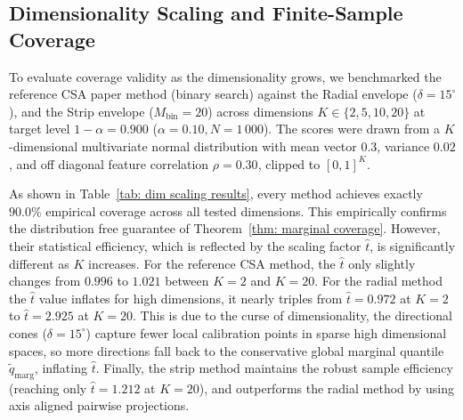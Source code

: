 

\subsection{Dimensionality Scaling and Finite-Sample Coverage}
\label{sec5.1.2: dimensionality scaling}

To evaluate coverage validity as the dimensionality grows, we benchmarked the reference CSA paper method (binary 
search) against the Radial envelope ($\delta = 15^\circ$), and the Strip envelope ($M_{\text{bin}} = 20$) across dimensions 
$K \in \{2, 5, 10, 20\}$ at target level $1-\alpha = 0.900$ ($\alpha = 0.10, N = 1\,000$). The scores were drawn from a 
$K$-dimensional multivariate normal distribution with mean vector $\mathbf{0.3}$, variance $0.02$, and off diagonal feature 
correlation $\rho = 0.30$, clipped to $[0,1]^K$.


As shown in Table~\ref{tab: dim scaling results}, every method achieves exactly $90.0\%$ empirical coverage across 
all tested dimensions. This empirically confirms the distribution free guarantee of Theorem~\ref{thm: marginal coverage}. 
However, their statistical efficiency, which is reflected by the scaling factor $\hat{t}$, is significantly different as $K$ 
increases. For the reference CSA method, the $\hat{t}$ only slightly changes from $0.996$ to $1.021$ between $K=2$ and $K=20$.
For the radial method the $\hat t$ value inflates for high dimensions, it nearly triples from $\hat{t} = 0.972$ at $K=2$ to 
$\hat{t} = 2.925$ at $K=20$. This is due to the curse of dimensionality, the directional cones ($\delta = 15^\circ$) capture 
fewer local calibration points in sparse high dimensional spaces, so more directions fall back to the conservative global 
marginal quantile $\tilde{q}_{\text{marg}}$, inflating $\hat{t}$. Finally, the strip method maintains the robust sample 
efficiency (reaching only $\hat{t} = 1.212$ at $K=20$), and outperforms the radial method by using axis aligned pairwise projections. 

